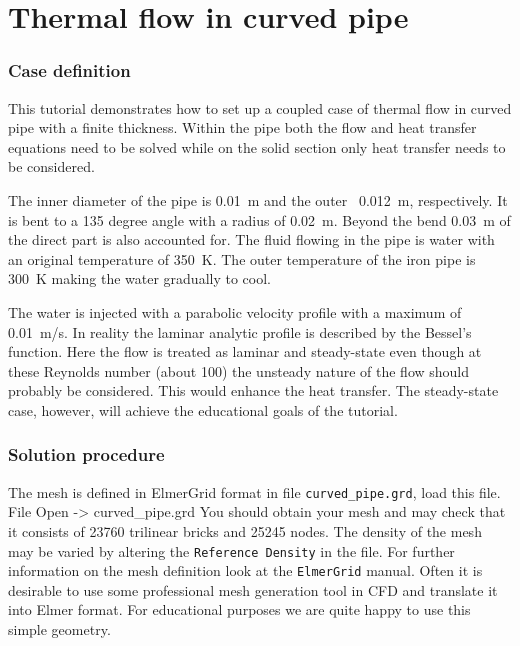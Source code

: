 \chapter{Thermal flow in curved pipe}



\subsection*{Case definition}
 

This tutorial demonstrates how to set up a coupled case
of thermal flow in curved pipe with a finite thickness. Within the pipe 
both the flow and heat transfer equations need to be solved while on the
solid section only heat transfer needs to be considered. 

The inner diameter of the pipe is 0.01~m and the outer ~0.012~m, respectively. 
It is bent to a 135 degree angle with a radius of 0.02~m. Beyond the bend
0.03~m of the direct part is also accounted for. 
The fluid flowing in the pipe is water with an original temperature of 350~K. 
The outer temperature of the iron pipe is 300~K making the water
gradually to cool. 

The water is injected with a parabolic velocity profile with a maximum
of 0.01~m/s. In reality the laminar analytic profile is described by the 
Bessel's function. Here the flow is treated as laminar and steady-state 
even though at these Reynolds number (about 100) the unsteady nature of the 
flow should probably be considered. This would enhance the heat transfer.
The steady-state case, however, will achieve the educational goals of the tutorial.

\subsection*{Solution procedure}

The mesh is defined in ElmerGrid format in file \texttt{curved\_pipe.grd}, load this file.
\ttbegin
File 
  Open -> curved\_pipe.grd
\ttend
You should obtain your mesh and may check that it consists of 23760 trilinear
bricks and 25245 nodes. The density of the mesh may be varied by altering
the \texttt{Reference Density} in the file. For further information on
the mesh definition look at the \texttt{ElmerGrid} manual. Often it is 
desirable to use some professional mesh generation tool in CFD and 
translate it into Elmer format. For educational purposes we are 
quite happy to use this simple geometry.  


